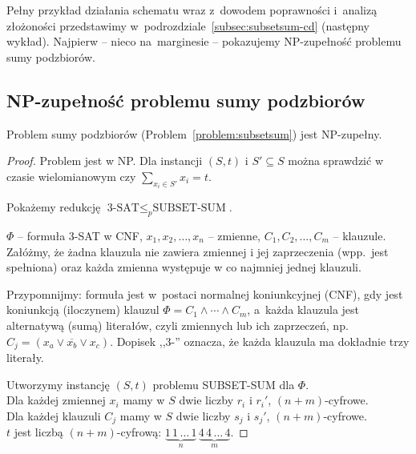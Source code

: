 Pełny przykład działania schematu wraz z~dowodem poprawności i~analizą złożoności przedstawimy w~podrozdziale~\ref{subsec:subsetsum-cd} (następny wykład). Najpierw -- nieco na~marginesie -- pokazujemy NP-zupełność problemu sumy podzbiorów.

\subsection{NP-zupełność problemu sumy podzbiorów}

\begin{theorem}
	Problem sumy podzbiorów (Problem~\ref{problem:subsetsum}) jest NP-zupełny.
\end{theorem}
\begin{proof}
	Problem jest w NP. Dla instancji $(S, t)$ i $S' \subseteq S$ można sprawdzić w czasie wielomianowym czy $\sum_{x_i \in S'} x_i = t$.

	Pokażemy redukcję $\text{3-SAT} \leq_p \text{SUBSET-SUM}$.

	$\Phi$ -- formuła 3-SAT w CNF, $x_1, x_2, \ldots, x_n$ -- zmienne, $C_1, C_2, \ldots, C_m$ -- klauzule. Załóżmy, że żadna klauzula nie zawiera zmiennej i jej zaprzeczenia (wpp.\ jest spełniona) oraz każda zmienna występuje w co najmniej jednej klauzuli.

	\begin{dygresja}
		Przypomnijmy: formuła jest w~postaci normalnej koniunkcyjnej (CNF), gdy jest koniunkcją (iloczynem) klauzul $\Phi = C_1 \wedge \cdots \wedge C_m$, a~każda klauzula jest alternatywą (sumą) literałów, czyli zmiennych lub ich zaprzeczeń, np.\ $C_j = (x_a \vee \overline{x_b} \vee x_c)$. Dopisek ,,3-'' oznacza, że każda klauzula ma dokładnie trzy literały.
	\end{dygresja}

	Utworzymy instancję $(S, t)$ problemu SUBSET-SUM dla $\Phi$.\\
	Dla każdej zmiennej $x_i$ mamy w $S$ dwie liczby $r_i$ i $r_i'$, $(n+m)$-cyfrowe.\\
	Dla każdej klauzuli $C_j$ mamy w $S$ dwie liczby $s_j$ i $s_j'$, $(n+m)$-cyfrowe.\\
	$t$ jest liczbą $(n+m)$-cyfrową: $\underbrace{1\,1\,\ldots\,1}_{n}\,\underbrace{4\,4\,\ldots\,4}_{m}$.


\end{proof}
